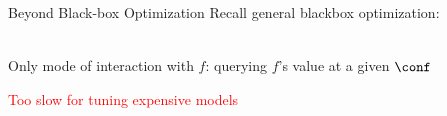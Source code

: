 \begin{frame}{Beyond Black-box Optimization}
\medskip
Recall general blackbox optimization:\\
        \bigskip
        \begin{center}
        \scalebox{0.7}{\hspace*{1.0cm}
        }\\
        \bigskip
         Only mode of interaction with $f$: querying $f$'s value at a given $\conf$
        
\pause
        \bigskip
        \bigskip
        \huge{\textcolor{red}{Too slow for tuning expensive models}}
        
        \end{center}
\vspace*{-6cm}
\begin{center}
\scalebox{15}{\color{Red}{$\bm{\times}$}}
\end{center}    
    
\end{frame}


